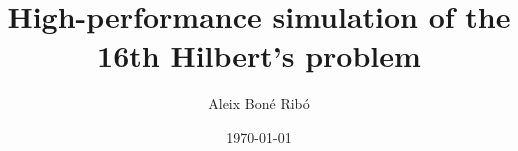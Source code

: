 



\usepackage{fancyhdr}
\usepackage{pgfgantt}
\usepackage{pdflscape}
\usepackage{titlesec}

\usepackage{chngcntr}

\titleformat{\paragraph}[hang]{\normalfont\normalsize\bfseries}{\theparagraph}{1em}{}

\renewcommand\theadfont{\bfseries}

\title{High-performance simulation of the 16th Hilbert's problem}
\author{Aleix Bon\'e Rib\'o}
\date{\today}




    



